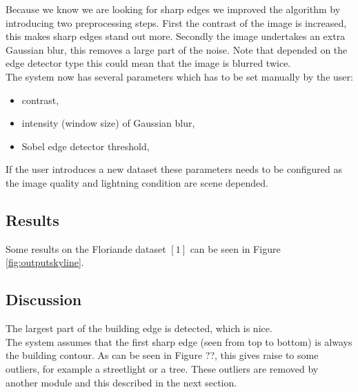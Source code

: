Because we know we are looking for sharp edges we improved the algorithm by
introducing two preprocessing steps. First the contrast of the image is
increased, this makes sharp edges stand out more.  Secondly the image undertakes
an extra Gaussian blur, this removes a large part of the noise. Note that
depended on the edge detector type this could mean that the image is blurred
twice.\\


The system now has several parameters which has to be set manually by the user:
\begin{itemize}
	\item contrast,
	\item intensity (window size) of Gaussian blur,
	\item Sobel edge detector threshold,
\end{itemize}

If the user introduces a new dataset these parameters needs to be configured
as the image quality and lightning condition are scene depended.


\subsection{Results}%
Some results on the Floriande dataset $[1]$ can be seen in Figure \ref{fig:outputskyline}.



\subsection{Discussion}  %
The largest part of the building edge is detected, which is nice.\\
The system assumes that the first sharp edge (seen from top to bottom) is always
the building contour. As can be seen in Figure ??, this gives raise to some
outliers, for example a streetlight or a tree. These outliers are removed by
another module and this described in the next section.  

